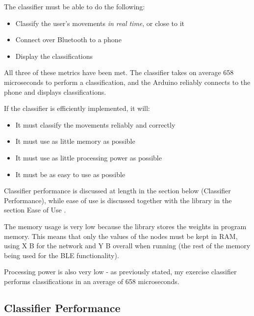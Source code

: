 \documentclass[a4paper]{article}
\begin{document}
The classifier must be able to do the following:

\begin{itemize}
\item Classify the user's movements \textit{in real time}, or close to it
\item Connect over Bluetooth to a phone
\item Display the classifications
\end{itemize}

All three of these metrics have been met. The classifier takes on average 658 microseconds\cite{dsref0} to perform a classification, and the Arduino reliably connects to the phone and displays classifications.

If the classifier is efficiently implemented, it will:

\begin{itemize}
\item It must classify the movements reliably and correctly
\item It must use as little memory as possible
\item It must use as little processing power as possible
\item It must be as easy to use as possible
\end{itemize}

Classifier performance is discussed at length in the section below (Classifier Performance), while ease of use is discussed together with the library in the section Ease of Use .

The memory usage is very low because the library stores the weights in program memory. This means that only the values of the nodes must be kept in RAM, using X B for the network and Y B  overall when running (the rest of the memory being used for the BLE functionality).

Processing power is also very low - as previously stated, my exercise classifier performs classifications in an average of 658 microseconds\cite{dsref0}. 

\subsection{Classifier Performance}%

\end{document}

